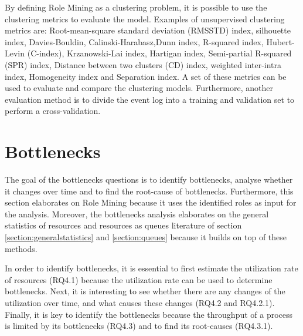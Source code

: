 By defining Role Mining as a clustering problem, it is possible to use the clustering metrics to evaluate the model. Examples of  unsupervised clustering metrics are: Root-mean-square standard deviation (RMSSTD) index, silhouette index, Davies-Bouldin, Calinski-Harabasz,Dunn index, R-squared index, Hubert-Levin (C-index), Krzanowski-Lai index, Hartigan index, Semi-partial R-squared (SPR) index, Distance between two clusters (CD) index, weighted inter-intra index, Homogeneity index and Separation index. A set of these metrics can be used to evaluate and compare the clustering models. Furthermore, another evaluation method is to divide the event log into a training and validation set to perform a cross-validation. 






\section{Bottlenecks}
The goal of the bottlenecks questions is to identify bottlenecks, analyse whether it changes over time and to find the root-cause of bottlenecks. Furthermore, this section elaborates on Role Mining because it uses the identified roles as input for the analysis. Moreover, the bottlenecks analysis elaborates on the general statistics of resources and resources as queues literature of section \ref{section:generalstatistics} and \ref{section:queues} because it builds on top of these methods.

In order to identify bottlenecks, it is essential to first estimate the utilization rate of resources (RQ4.1) because the utilization rate can be used to determine bottlenecks. Next, it is interesting to see whether there are any changes of the utilization over time, and what causes these changes (RQ4.2 and RQ4.2.1). Finally, it is key to identify the bottlenecks because the throughput of a process is limited by its bottlenecks (RQ4.3) and to find its root-causes (RQ4.3.1). 

